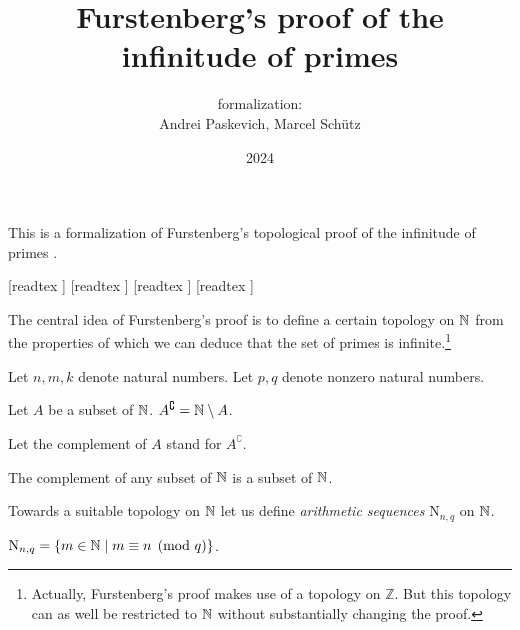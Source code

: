 \documentclass{article}
\title{Furstenberg's proof of the infinitude of primes}
\author{\Naproche formalization:\\[0.5em]Andrei Paskevich, Marcel Schütz}
\date{2024}
\newcommand{\N}{\mathrm{N}}
\newcommand{\Int}{\mathbb{Z}}
\begin{document}
  \maketitle

  \noindent This is a formalization of Furstenberg's topological proof of the
  infinitude of primes \cite[p. 353]{Furstenberg1955}.

  \begin{imports}
    \begin{forthel}
      [readtex ]
      [readtex ]
      [readtex ]
      [readtex ]
    \end{forthel}
  \end{imports}

  The central idea of Furstenberg's proof is to define a certain topology on
  $\mathbb{N}$ from the properties of which we can deduce that the set of
  primes is infinite.\footnote{Actually, Furstenberg's proof makes use of a
  topology on $\Int$. But this topology can as well be restricted to
  $\mathbb{N}$ without substantially changing the proof.}

  \begin{forthel}
    Let $n, m, k$ denote natural numbers.
    Let $p, q$ denote nonzero natural numbers.

    \begin{definition}
      Let $A$ be a subset of $\mathbb{N}$.
      $A^\complement = \mathbb{N} \setminus A$.
    \end{definition}

    Let the complement of $A$ stand for $A^\complement$.

    \begin{lemma}
      The complement of any subset of $\mathbb{N}$ is a subset of $\mathbb{N}$.
    \end{lemma}
  \end{forthel}

  Towards a suitable topology on $\mathbb{N}$ let us define \textit{arithmetic
  sequences} $\N_{n, q}$ on $\mathbb{N}$.

  \begin{forthel}
    \begin{definition}
      $\N_{n, q} = \{ m \in \Nat \mid m \equiv n \pmod{q} \}$.
    \end{definition}
  \end{forthel}
\end{document}
